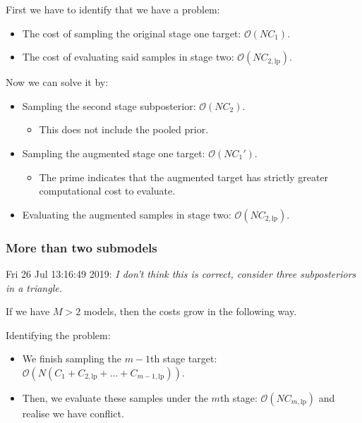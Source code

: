 \documentclass[10pt,a4paper,]{article}
\providecommand{\tightlist}{%
  \setlength{\itemsep}{0pt}\setlength{\parskip}{0pt}}
\newcommand{\Nx}{N}
\newcommand{\Nm}{M}
\newcommand{\modelindex}{m}
\begin{document}
First we have to identify that we have a problem:

\begin{itemize}
\tightlist
\item
  The cost of sampling the original stage one target:
  \(\mathcal{O}(\Nx C_{1})\).
\item
  The cost of evaluating said samples in stage two:
  \(\mathcal{O}(\Nx C_{2, \text{lp}})\).
\end{itemize}

Now we can solve it by:

\begin{itemize}
\tightlist
\item
  Sampling the second stage subposterior: \(\mathcal{O}(\Nx C_{2})\).

  \begin{itemize}
  \tightlist
  \item
    This does not include the pooled prior.
  \end{itemize}
\item
  Sampling the augmented stage one target: \(\mathcal{O}(\Nx C_{1}')\).

  \begin{itemize}
  \tightlist
  \item
    The prime indicates that the augmented target has strictly greater
    computational cost to evaluate.
  \end{itemize}
\item
  Evaluating the augmented samples in stage two:
  \(\mathcal{O}(\Nx C_{2, \text{lp}})\).
\end{itemize}

\subsubsection*{More than two submodels}\label{more-than-two-submodels}

Fri 26 Jul 13:16:49 2019: \emph{I don't think this is correct, consider
three subposteriors in a triangle.}

If we have \(\Nm > 2\) models, then the costs grow in the following way.

Identifying the problem:

\begin{itemize}
\tightlist
\item
  We finish sampling the \(\modelindex-1\)th stage target:
  \(\mathcal{O}(\Nx (C_{1} + C_{2, \text{lp}} + \ldots + C_{\modelindex - 1, \text{lp}}))\).
\item
  Then, we evaluate these samples under the \(\modelindex\)th stage:
  \(\mathcal{O}(\Nx C_{\modelindex, \text{lp}})\) and realise we have
  conflict.
\end{itemize}
\end{document}
